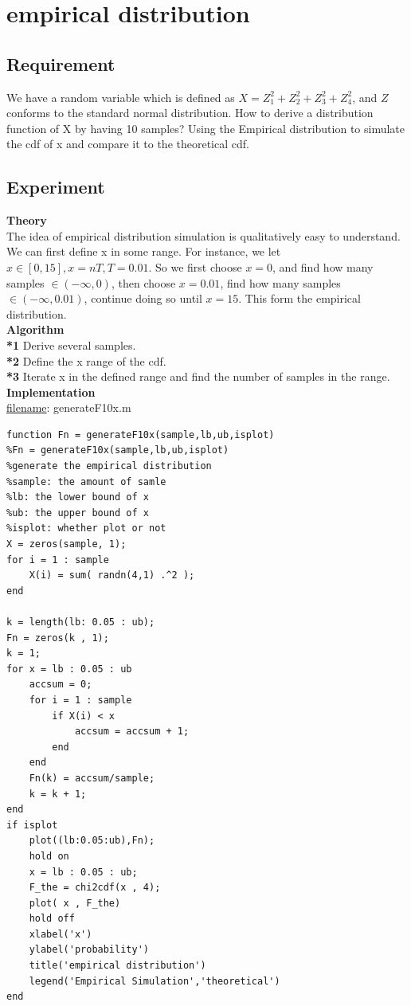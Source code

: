 \documentclass[twoside]{article}
\begin{document}
\newpage
\section{empirical distribution}
\subsection{\normalsize{Requirement}}
We have a random variable which is defined as $X= Z_1^2 +Z_2^2 +Z_3^2 +Z_4^2 $, and $Z$ conforms to the standard normal distribution. How to derive a distribution function of X by having 10 samples? Using the Empirical distribution to simulate the cdf of x and compare it to the theoretical cdf.\\

\subsection{\normalsize{Experiment}}
\noindent \textbf {Theory}\\
The idea of empirical distribution simulation is qualitatively easy to understand. We can first define x in some range. For instance, we let $x \in [0,15], x = nT, T = 0.01$. So we first choose $x = 0$, and find how many samples $\in (-\infty,0)$, then choose $x = 0.01$, find how many samples  $\in (-\infty,0.01)$, continue doing so until $x=15$. This form the empirical distribution.\\
\noindent \textbf {Algorithm}\\
\noindent \textbf {*1} Derive several samples.\\
\noindent \textbf {*2} Define the x range of the cdf.\\
\noindent \textbf {*3} Iterate x in the defined range and find the number of samples in the range.\\[10pt]
\noindent \textbf {Implementation}\\
\underline{filename}: generateF10x.m
\begin{lstlisting}
function Fn = generateF10x(sample,lb,ub,isplot)
%Fn = generateF10x(sample,lb,ub,isplot)
%generate the empirical distribution
%sample: the amount of samle 
%lb: the lower bound of x
%ub: the upper bound of x
%isplot: whether plot or not
X = zeros(sample, 1);
for i = 1 : sample 
    X(i) = sum( randn(4,1) .^2 );
end

k = length(lb: 0.05 : ub);
Fn = zeros(k , 1);
k = 1;
for x = lb : 0.05 : ub
    accsum = 0;
    for i = 1 : sample
        if X(i) < x
            accsum = accsum + 1;
        end
    end
    Fn(k) = accsum/sample;
    k = k + 1; 
end
if isplot
    plot((lb:0.05:ub),Fn);
    hold on 
    x = lb : 0.05 : ub;
    F_the = chi2cdf(x , 4);
    plot( x , F_the)
    hold off 
    xlabel('x')
    ylabel('probability')
    title('empirical distribution')
    legend('Empirical Simulation','theoretical')
end
\end{lstlisting}
\end{document}
